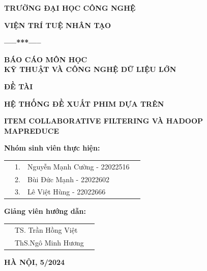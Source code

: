 \documentclass{report}
\begin{document}
\begin{center}
    \LARGE
    \textbf{TRƯỜNG ĐẠI HỌC CÔNG NGHỆ}

    \vspace{0.5cm}
    \Large
    \textbf{VIỆN TRÍ TUỆ NHÂN TẠO}

    \vspace{0.5cm}
    \Large
    \textbf{-----***-----}

    \vspace{2.5cm}
    \textbf{BÁO CÁO MÔN HỌC}\\
    \textbf{KỸ THUẬT VÀ CÔNG NGHỆ DỮ LIỆU LỚN}

    \vspace{0.5cm}
    \textbf{ĐỀ TÀI}

    \vspace{0.5cm}
    \centerline{\textbf{HỆ THỐNG ĐỀ XUẤT PHIM DỰA TRÊN}}
    \centerline{\textbf{ITEM COLLABORATIVE FILTERING VÀ HADOOP MAPREDUCE}}

    \vspace{2cm}
    \textbf{Nhóm sinh viên thực hiện:} \\

    \vspace{0.2cm}
    \begin{tabular}{p{8cm}lll}
         & 1. & Nguyễn Mạnh Cường - 22022516 \\
         & 2. & Bùi Đức Mạnh - 22022602      \\
         & 3. & Lê Việt Hùng - 22022666      \\
    \end{tabular}

    \vspace{0.5cm}
    \textbf{Giảng viên hướng dẫn:} \\
    \vspace{0.2cm}
    \begin{tabular}{p{6cm}ll}
         & TS. Trần Hồng Việt \\
         & ThS.Ngô Minh Hương \\
    \end{tabular}

    \vfill

    \textbf{HÀ NỘI, 5/2024}


\end{center}
\end{document}
